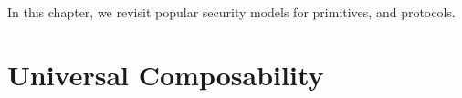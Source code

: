 In this chapter, we revisit popular security models for primitives, and protocols.

\section{Universal Composability}
